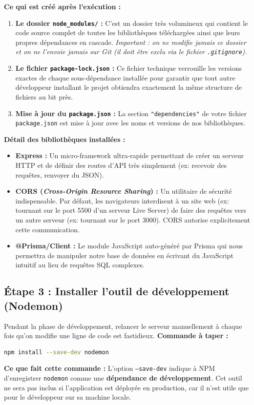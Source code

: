 \textbf{Ce qui est créé après l'exécution :}
\begin{enumerate}
    \item \textbf{Le dossier \texttt{node\_modules/} :} C'est un dossier très volumineux qui contient le code source complet de toutes les bibliothèques téléchargées ainsi que leurs propres dépendances en cascade. \textit{Important : on ne modifie jamais ce dossier et on ne l'envoie jamais sur Git (il doit être exclu via le fichier \texttt{.gitignore}).}
    \item \textbf{Le fichier \texttt{package-lock.json} :} Ce fichier technique verrouille les versions exactes de chaque sous-dépendance installée pour garantir que tout autre développeur installant le projet obtiendra exactement la même structure de fichiers au bit près.
    \item \textbf{Mise à jour du \texttt{package.json} :} La section \texttt{"dependencies"} de votre fichier \texttt{package.json} est mise à jour avec les noms et versions de nos bibliothèques.
\end{enumerate}

\textbf{Détail des bibliothèques installées :}
\begin{itemize}
    \item \textbf{Express :} Un micro-framework ultra-rapide permettant de créer un serveur HTTP et de définir des routes d'API très simplement (ex: recevoir des requêtes, renvoyer du JSON).
    \item \textbf{CORS (\textit{Cross-Origin Resource Sharing}) :} Un utilitaire de sécurité indispensable. Par défaut, les navigateurs interdisent à un site web (ex: tournant sur le port 5500 d'un serveur Live Server) de faire des requêtes vers un autre serveur (ex: tournant sur le port 3000). CORS autorise explicitement cette communication.
    \item \textbf{@Prisma/Client :} Le module JavaScript auto-généré par Prisma qui nous permettra de manipuler notre base de données en écrivant du JavaScript intuitif au lieu de requêtes SQL complexes.
\end{itemize}

\subsection{Étape 3 : Installer l'outil de développement (Nodemon)}
Pendant la phase de développement, relancer le serveur manuellement à chaque fois qu'on modifie une ligne de code est fastidieux.
\textbf{Commande à taper :}
\begin{lstlisting}[language=bash]
npm install --save-dev nodemon
\end{lstlisting}
\textbf{Ce que fait cette commande :}
L'option \texttt{--save-dev} indique à NPM d'enregistrer \texttt{nodemon} comme une \textbf{dépendance de développement}. Cet outil ne sera pas inclus si l'application est déployée en production, car il n'est utile que pour le développeur sur sa machine locale.

